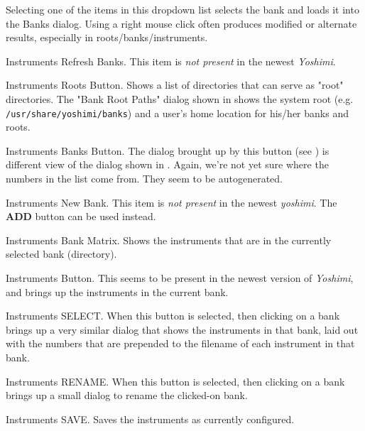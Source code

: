    Selecting one of the items in this dropdown list selects the bank and
   loads it into the Banks dialog.
   Using a right mouse click often produces modified or alternate results,
   especially in roots/banks/instruments.

   Instruments Refresh Banks.
   This item is \textsl{not present} in the newest \textsl{Yoshimi}.

   Instruments Roots Button.
   Shows a list of directories that can serve as "root" directories.
   The "Bank Root Paths" dialog shown in
    shows
   the system root (e.g. \texttt{/usr/share/yoshimi/banks}) and
   a user's home location for his/her banks and roots.

   Instruments Banks Button.
   The dialog brought up by this button
   (see )
   is different view of the dialog shown in
   .
   Again, we're not yet sure where the numbers in the list come from.
   They seem to be autogenerated.

   Instruments New Bank.
   This item is \textsl{not present} in the newest \textsl{yoshimi}.
   The \textbf{ADD} button can be used instead.

   Instruments Bank Matrix.
   Shows the instruments that are in the currently selected bank
   (directory).

   Instruments Button.
   This seems to be present in the newest version of 
   \textsl{Yoshimi}, and brings up the instruments in the current bank.

   Instruments SELECT.
   When this button is selected, then clicking on a bank brings
   up a very similar dialog that shows the instruments in that bank, laid
   out with the numbers that are prepended to the filename of each
   instrument in that bank.

   Instruments RENAME.
   When this button is selected, then clicking on a bank brings
   up a small dialog to rename the clicked-on bank.

   Instruments SAVE.
   Saves the instruments as currently configured.

